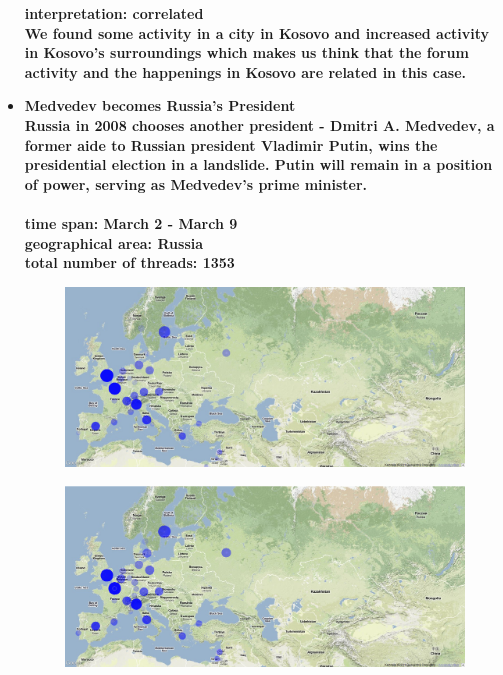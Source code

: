 \documentclass[11pt,a4paper,english]{article}
\begin{document}
\begin{itemize}
\begin{figure}[H]
\begin{center}
							\end{center}
							\vspace{-13pt}
						\end{figure}	
						\bf interpretation: \rm correlated
						\\ We found some activity in a city in Kosovo and increased activity in Kosovo's surroundings which makes us think that the forum activity and the happenings in Kosovo are related in this case.
						
						
						
					\item \bf Medvedev becomes Russia's President \rm
						\\ Russia in 2008 chooses another president - Dmitri A. Medvedev, a former aide to Russian president Vladimir Putin, wins the presidential election in a landslide. Putin will remain in a position of power, serving as Medvedev's prime minister.
						\\\\ \bf time span: \rm March 2 - March 9
						\\ \bf geographical area: \rm Russia
						\\ \bf total number of threads: \rm 1353
						\begin{figure}[H]
							\vspace{-13pt}
  							\begin{center}
								\includegraphics[width=130mm]{img/pre-medvev}		
							\end{center}
							\vspace{-13pt}
						\end{figure}
						\begin{figure}[H]
							\vspace{-13pt}
	  						\begin{center}
								\includegraphics[width=130mm]{img/post-medvev}

\end{center}
\end{figure}
\end{itemize}
\end{document}
